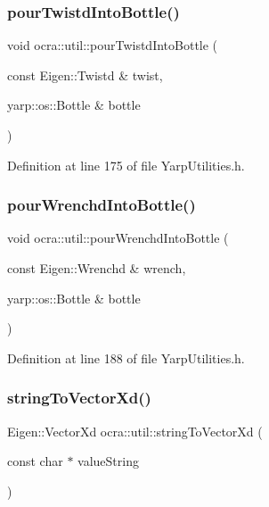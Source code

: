 \subsubsection{\texorpdfstring{pour\+Twistd\+Into\+Bottle()}{pourTwistdIntoBottle()}}
{\footnotesize\ttfamily void ocra\+::util\+::pour\+Twistd\+Into\+Bottle (\begin{DoxyParamCaption}\item[{const Eigen\+::\+Twistd \&}]{twist,  }\item[{yarp\+::os\+::\+Bottle \&}]{bottle }\end{DoxyParamCaption})\hspace{0.3cm}{\ttfamily [inline]}}



Definition at line 175 of file Yarp\+Utilities.\+h.

\hypertarget{namespaceocra_1_1util_a139674d4658e91e350b4d8704f38ab42}{}\label{namespaceocra_1_1util_a139674d4658e91e350b4d8704f38ab42} 
\subsubsection{\texorpdfstring{pour\+Wrenchd\+Into\+Bottle()}{pourWrenchdIntoBottle()}}
{\footnotesize\ttfamily void ocra\+::util\+::pour\+Wrenchd\+Into\+Bottle (\begin{DoxyParamCaption}\item[{const Eigen\+::\+Wrenchd \&}]{wrench,  }\item[{yarp\+::os\+::\+Bottle \&}]{bottle }\end{DoxyParamCaption})\hspace{0.3cm}{\ttfamily [inline]}}



Definition at line 188 of file Yarp\+Utilities.\+h.

\hypertarget{namespaceocra_1_1util_a34b1e831cf424dfc9bbd089e30f1ae32}{}\label{namespaceocra_1_1util_a34b1e831cf424dfc9bbd089e30f1ae32} 
\subsubsection{\texorpdfstring{string\+To\+Vector\+Xd()}{stringToVectorXd()}}
{\footnotesize\ttfamily Eigen\+::\+Vector\+Xd ocra\+::util\+::string\+To\+Vector\+Xd (\begin{DoxyParamCaption}\item[{const char $\ast$}]{value\+String }\end{DoxyParamCaption})\hspace{0.3cm}{\ttfamily [inline]}}



